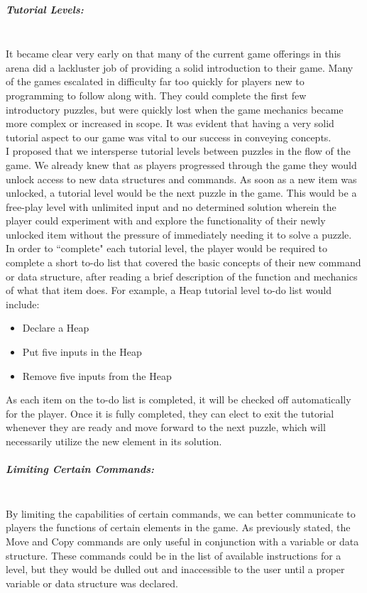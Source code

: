\subparagraph{Tutorial Levels:}\mbox{} \\
It became clear very early on that many of the current game offerings in this arena did a lackluster job of
providing a solid introduction to their game. Many of the games escalated in difficulty far too quickly for
players new to programming to follow along with. They could complete the first few introductory puzzles,
but were quickly lost when the game mechanics became more complex or increased in scope. It was evident
that having a very solid tutorial aspect to our game was vital to our success in conveying concepts.\\

I proposed that we intersperse tutorial levels between puzzles in the flow of the game. We already knew that
as players progressed through the game they would unlock access to new data structures and commands. As
soon as a new item was unlocked, a tutorial level would be the next puzzle in the game. This would be a free-play
level with unlimited input and no determined solution wherein the player could experiment with and explore
the functionality of their newly unlocked item without the pressure of immediately needing it to solve a puzzle.\\

In order to ``complete" each tutorial level, the player would be required to complete a short to-do list that
covered the basic concepts of their new command or data structure, after reading a brief description of the function
and mechanics of what that item does. For example, a Heap tutorial level to-do list would include:
\begin{itemize}
	\item Declare a Heap
	\item Put five inputs in the Heap
	\item Remove five inputs from the Heap
\end{itemize}
As each item on the to-do list is completed, it will be checked off automatically for the player. Once it is fully
completed, they can elect to exit the tutorial whenever they are ready and move forward to the next
puzzle, which will necessarily utilize the new element in its solution. \\

\subparagraph{Limiting Certain Commands:}\mbox{} \\
By limiting the capabilities of certain commands, we can better communicate to players the functions of certain
elements in the game. As previously stated, the Move and Copy commands are only useful in conjunction with a
variable or data structure. These commands could be in the list of available instructions for a level, but they would be
dulled out and inaccessible to the user until a proper variable or data structure was declared.\\

